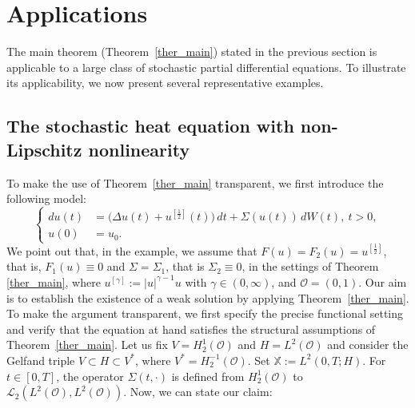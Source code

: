 \documentclass[english,a4paper,11pt]{amsart}
\theoremstyle{plain}
\theoremstyle{definition}
\theoremstyle{remark}
\numberwithin{equation}{section}
\newcommand{\CO}{{{ \mathcal O }}}
\newcommand{\Ocal} {{\mathcal O}}
\newcommand{\X}{\mathbb{X}}
\begin{document}
	




\section{Applications}\label{sec:app}
The main theorem (Theorem~\ref{ther_main}) stated in the previous section is applicable to a large class of stochastic partial differential equations. To illustrate its applicability, we now present several representative examples.

\subsection{The stochastic heat equation with non-Lipschitz nonlinearity}\label{Example1}
%
To make the use of Theorem~\ref{ther_main} transparent, we first introduce the following model:
\begin{equation}\label{firstex}
	\left\{
	\begin{aligned}
		d u(t)&= \big(\Delta u(t)+u^{[\frac{1}{2}]}(t)\big)\, d t+\Sigma (u(t))\, dW(t),\ t> 0,\\
		u(0)&=u_0.
	\end{aligned}
	\right.
\end{equation}
%
%
We point out that, in the example, we assume that $F(u)=F_2(u)=u^{[\frac{1}{2}]}$, that is, $F_1(u)\equiv 0$ and $\Sigma=\Sigma_1$, that is $\Sigma_2\equiv 0$, in the settings of Theorem \ref{ther_main}, where \(u^{[\gamma]}:=|u|^{\gamma-1}u\) with \(\gamma\in(0,\infty)\), and \(\Ocal=(0,1)\).
Our aim is to establish the existence of a weak solution by applying Theorem~\ref{ther_main}. To make the argument transparent, we first specify the precise functional setting and verify that the equation at hand satisfies the structural assumptions of Theorem~\ref{ther_main}. 
 Let us fix $V=H_2^1(\Ocal)$ and $H=L^2(\Ocal)$ and consider the Gelfand triple $V \subset H \subset V^\ast $, where $V^\ast=H_2^{-1}(\Ocal)$. Set $\X:=L^2(0,T;H)$. For $t\in[0,T]$, the operator $\Sigma(t,\cdot)$ is defined from $H_2^{1}(\CO)$ to $\mathcal{L}_2(L^2(\CO),L^2(\CO))$.  Now, we can state our claim:
 
\end{document}
